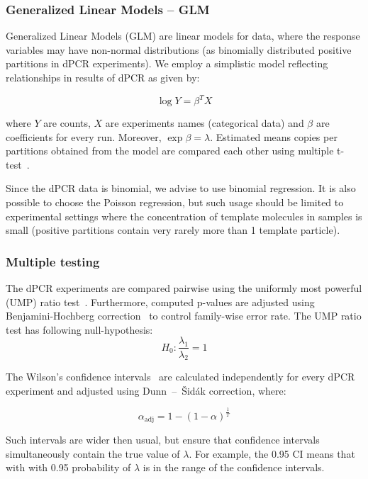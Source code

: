 \documentclass[a4,center,fleqn]{NAR}
\begin{document}
\subsubsection[]{Generalized Linear Models -- GLM}

Generalized Linear Models (GLM) are linear models for data, where the response 
variables may have non-normal distributions (as binomially distributed positive 
partitions in dPCR experiments). We employ a simplistic model reflecting 
relationships in results of dPCR as given by:

\begin{equation}
\log{Y} = \beta^T X
\end{equation}

where $Y$ are counts, $X$ are experiments names (categorical data) and $\beta$ 
are coefficients for every run. Moreover, $\exp{\beta} = 
\lambda$. Estimated means copies per partitions obtained from the model are 
compared each other using multiple t-test~\citep{bretz_2010}.

Since the dPCR data is binomial, we advise to use binomial regression. It is 
also possible to choose the Poisson regression, but such usage should be limited to 
experimental settings where the concentration of template molecules in samples is 
small (positive partitions contain very rarely more than 1 template particle). 

\subsubsection[]{Multiple testing}

The dPCR experiments are compared pairwise using the uniformly most powerful 
(UMP) ratio test~\citep{fay_2010}. Furthermore, computed p-values are adjusted 
using Benjamini-Hochberg correction~\citep{benjamini_1995} to control 
family-wise error rate. The UMP ratio test has following null-hypothesis:
\begin{equation}
H_0: \frac{\lambda_1}{\lambda_2} = 1
\end{equation}

The Wilson's confidence intervals~\citep{brown_2001} are calculated 
independently for every dPCR experiment and adjusted using Dunn~--~\v{S}id\'{a}k 
correction, where:

\begin{equation}
\alpha_{\text{adj}} = 1 - (1 - \alpha)^\frac{1}{T}
\end{equation}

Such intervals are wider then usual, but ensure that confidence intervals 
simultaneously contain the true value of $\lambda$. For example, the 0.95 CI 
means that with with 0.95 probability of $\lambda$ is in the range of the 
confidence intervals.
\end{document}
